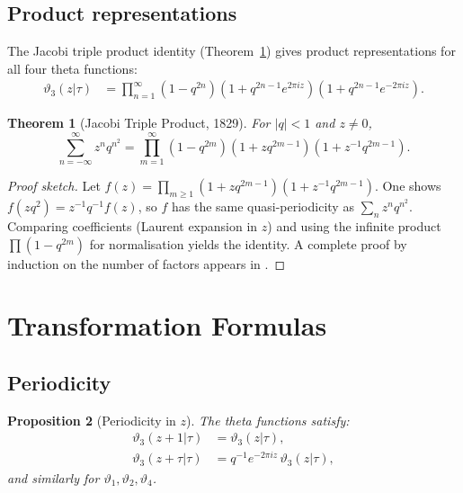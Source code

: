 \documentclass[12pt,a4paper]{amsart}
\newtheorem{theorem}{Theorem}[section]
\newtheorem{proposition}[theorem]{Proposition}
\theoremstyle{definition}
\begin{document}
\subsection{Product representations}

The Jacobi triple product identity (Theorem~\ref{thm:triple}) gives product
representations for all four theta functions:
\begin{align}
  \vartheta_3(z|\tau) &= \prod_{n=1}^{\infty}
    (1-q^{2n})(1+q^{2n-1}e^{2\pi iz})(1+q^{2n-1}e^{-2\pi iz}).
\end{align}

\begin{theorem}[Jacobi Triple Product, 1829]\label{thm:triple}
For $|q|<1$ and $z \neq 0$,
\[
  \sum_{n=-\infty}^{\infty} z^n q^{n^2}
  = \prod_{m=1}^{\infty}(1-q^{2m})(1+zq^{2m-1})(1+z^{-1}q^{2m-1}).
\]
\end{theorem}

\begin{proof}[Proof sketch]
Let $f(z) = \prod_{m\geq1}(1+zq^{2m-1})(1+z^{-1}q^{2m-1})$.
One shows $f(zq^2) = z^{-1}q^{-1}f(z)$, so $f$ has the same quasi-periodicity
as $\sum_n z^n q^{n^2}$.  Comparing coefficients (Laurent expansion in $z$)
and using the infinite product $\prod(1-q^{2m})$ for normalisation yields the identity.
A complete proof by induction on the number of factors appears in \cite{WhittakerWatson1927}.
\end{proof}

\section{Transformation Formulas}\label{sec:transformation}

\subsection{Periodicity}

\begin{proposition}[Periodicity in $z$]\label{prop:period_z}
The theta functions satisfy:
\begin{align}
  \vartheta_3(z+1|\tau) &= \vartheta_3(z|\tau),\\
  \vartheta_3(z+\tau|\tau) &= q^{-1} e^{-2\pi iz}\, \vartheta_3(z|\tau),
\end{align}
and similarly for $\vartheta_1, \vartheta_2, \vartheta_4$.
\end{proposition}
\end{document}

